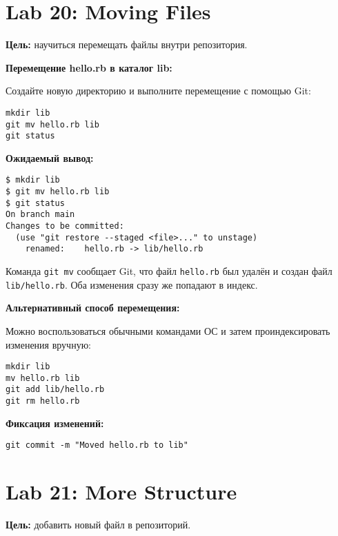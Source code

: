 \documentclass[a4paper,12pt]{report}
\begin{document}
\section{Lab 20: Moving Files}

\textbf{Цель:} научиться перемещать файлы внутри репозитория.

\textbf{Перемещение hello.rb в каталог lib:}

Создайте новую директорию и выполните перемещение с помощью Git:
\begin{verbatim}
mkdir lib
git mv hello.rb lib
git status
\end{verbatim}

\textbf{Ожидаемый вывод:}
\begin{verbatim}
$ mkdir lib
$ git mv hello.rb lib
$ git status
On branch main
Changes to be committed:
  (use "git restore --staged <file>..." to unstage)
	renamed:    hello.rb -> lib/hello.rb
\end{verbatim}

Команда \texttt{git mv} сообщает Git, что файл \texttt{hello.rb} был удалён и создан файл \texttt{lib/hello.rb}. Оба изменения сразу же попадают в индекс.


\textbf{Альтернативный способ перемещения:}

Можно воспользоваться обычными командами ОС и затем проиндексировать изменения вручную:
\begin{verbatim}
mkdir lib
mv hello.rb lib
git add lib/hello.rb
git rm hello.rb
\end{verbatim}

\textbf{Фиксация изменений:}
\begin{verbatim}
git commit -m "Moved hello.rb to lib"
\end{verbatim}


\section{Lab 21: More Structure}

\textbf{Цель:} добавить новый файл в репозиторий.
\end{document}
